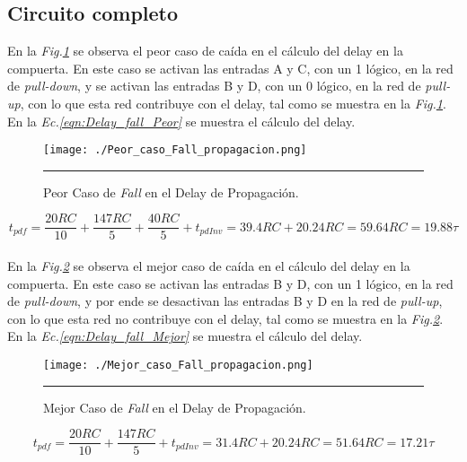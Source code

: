 \documentclass[12pt,a4paper]{article} %
\begin{document}
\subsection{Circuito completo}

En la \textit{Fig.\ref{fig:Peor_caso_Fall_propagacion}} se observa el peor caso de caída en el cálculo del delay en la compuerta. En este caso se activan las entradas A y C, con un 1 lógico, en la red de \textit{pull-down}, y se activan las entradas B y D, con un 0 lógico, en la red de \textit{pull-up}, con lo que esta red contribuye con el delay, tal como se muestra en la \textit{Fig.\ref{fig:Peor_caso_Fall_propagacion}}. En la \textit{Ec.\ref{eqn:Delay_fall_Peor}} se muestra el cálculo del delay.\\

\begin{figure}[htbp]
  \centering
    \texttt{[image: ./Peor\_caso\_Fall\_propagacion.png]}
    \rule{35em}{0.3pt}
  \caption[C_Carga]{Peor Caso de \textit{Fall} en el Delay de Propagación.}
  \label{fig:Peor_caso_Fall_propagacion}
\end{figure}


\begin{equation}\label{eqn:Delay_fall_Peor}
t_{pdf} = \frac{20RC}{10}+\frac{147RC}{5}+\frac{40RC}{5}+t_{pdInv}=39.4RC+20.24RC=59.64RC=19.88\tau
\end{equation}\\


En la \textit{Fig.\ref{fig:Mejor_caso_Fall_propagacion}} se observa el mejor caso de caída en el cálculo del delay en la compuerta. En este caso se activan las entradas B y D, con un 1 lógico, en la red de \textit{pull-down}, y por ende se desactivan las entradas B y D en la red de \textit{pull-up}, con lo que esta red no contribuye con el delay, tal como se muestra en la \textit{Fig.\ref{fig:Mejor_caso_Fall_propagacion}}. En la \textit{Ec.\ref{eqn:Delay_fall_Mejor}} se muestra el cálculo del delay.\\

\begin{figure}[htbp]
  \centering
    \texttt{[image: ./Mejor\_caso\_Fall\_propagacion.png]}
    \rule{35em}{0.3pt}
  \caption[C_Carga]{Mejor Caso de \textit{Fall} en el Delay de Propagación.}
  \label{fig:Mejor_caso_Fall_propagacion}
\end{figure}


\begin{equation}\label{eqn:Delay_fall_Mejor}
t_{pdf} = \frac{20RC}{10}+\frac{147RC}{5}+t_{pdInv}=31.4RC+20.24RC=51.64RC=17.21\tau
\end{equation}\\
\end{document}
